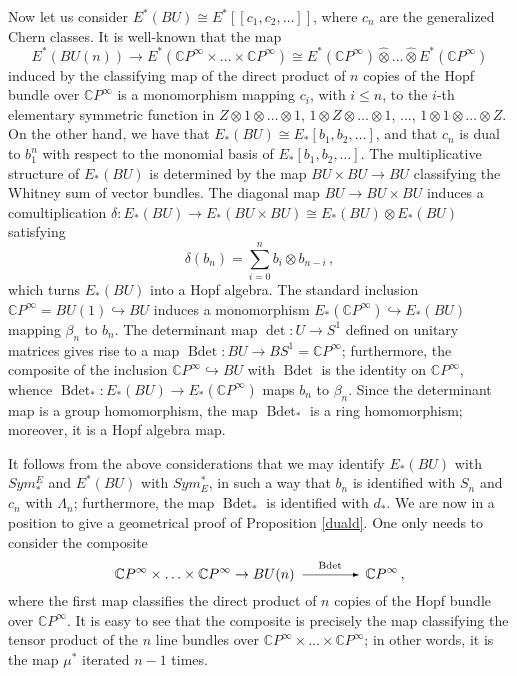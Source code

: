 \documentclass[a4paper,12pt]{amsart}
\theoremstyle{definition}
\numberwithin{equation}{section}
\newcommand{\bC}{{\mathbb C}}
\newcommand{\arr}{\begin{picture}(45,5) \put(3,2.5){\vector(1,0){40}} \end{picture}}
\newcommand{\arrl}[1]{\stackrel{#1}{\arr}}
\newcommand{\CP}{\bC P^\infty}
\newcommand{\EuC}{E^*(\CP)}
\newcommand{\ElC}{E_*(\CP)}
\newcommand{\dt}{\operatorname{det}}
\newcommand{\Bdt}{\operatorname{Bdet}}
\begin{document}
Now let us consider $E^*(BU)\cong E^*[[c_1,c_2,\ldots]]$, where $c_n$ are the generalized Chern classes. It is well-known that the map
\[E^*(BU(n))\rightarrow E^*(\CP\times\ldots\times\CP)\cong\EuC\widehat{\otimes}\ldots\widehat{\otimes}\EuC\]
induced by the classifying map of the direct product of $n$ copies of
the Hopf bundle over $\bC P^\infty$ is a monomorphism mapping $c_i$, with $i\le n$, to
the $i$-th elementary symmetric function in $Z\otimes 1\otimes\ldots\otimes
1$, $1\otimes Z\otimes\ldots\otimes 1$, ..., $1\otimes
1\otimes\ldots\otimes Z$. On the other hand, we have that
$E_*(BU)\cong E_*[b_1,b_2,\ldots]$, and that $c_n$ is dual to $b_1^n$
with respect to the monomial basis of $E_*[b_1,b_2,\ldots]$. The
multiplicative structure of $E_*(BU)$ is determined by the map
$BU\times BU\rightarrow BU$ classifying the Whitney sum of vector
bundles. The diagonal map $BU\rightarrow BU\times BU$ induces a comultiplication $\delta\colon E_*( BU)\rightarrow E_*( BU\times BU)\cong E_*( BU)\otimes E_*( BU)$ satisfying
\[\delta(b_n)=\sum_{i=0}^n b_i\otimes b_{n-i}\,,\]
which turns $E_*( BU)$ into a Hopf algebra. The standard inclusion $\bC P^\infty=BU(1)\hookrightarrow BU$ induces a monomorphism $\ElC\hookrightarrow E_*(BU)$ mapping $\beta_n$ to $b_n$. The determinant map $\dt\colon U\rightarrow S^1$ defined on unitary matrices gives rise to a map $\Bdt\colon BU\rightarrow BS^1=\bC P^\infty$; furthermore, the composite of the inclusion $\bC P^\infty\hookrightarrow BU$ with $\Bdt$ is the identity on $\bC P^\infty$, whence $\Bdt_*\colon E_*(BU)\rightarrow \ElC$ maps $b_n$ to $\beta_n$. Since the determinant map is a group homomorphism, the map $\Bdt_*$ is a ring homomorphism; moreover, it is a Hopf algebra map.

It follows from the above considerations that we may identify
$E_*(BU)$ with $Sym_*^E$ and $E^*(BU)$ with $Sym_E^*$, in such a way
that $b_n$ is identified with $S_n$ and $c_n$ with $\varLambda_n$; furthermore, the map $\Bdt_*$ is identified with $d_*$. We are now in a position to give a geometrical proof of Proposition
\ref{duald}. One only needs to consider the composite 
\[ \bC P^\infty\times\ldots\times\bC P^\infty\rightarrow
BU(n)\arrl{\Bdt}\bC P^\infty\,,\]
where the first map classifies the direct product of $n$ copies of the
Hopf bundle
over $\bC P^\infty$. It is easy to see that the composite is
precisely the map classifying the tensor product of the $n$ line
bundles over $\bC P^\infty\times\ldots\times\bC P^\infty$; in other
words, it is the map $\mu^*$ iterated $n-1$ times.
\end{document}
